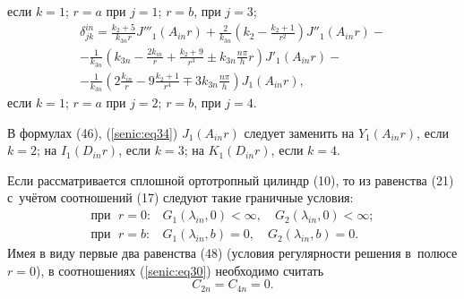 если $k = 1$; $r=a$ при $j = 1$; $r=b$, при $j = 3$;
\begin{multline}
\delta _{jk}^{in} = \frac{k_2 + 5}{k_{3n} r}{J}'''_1 \left( {A_{in} r} 
\right) + \frac{2}{k_{3n} }\left( {k_2 - \frac{k_2 + 1}{r^2}} \right){J}''_1 
\left( {A_{in} r} \right) -\\- \frac{1}{k_{3n} }\left( {k_{3n} - \frac{2k_{in} 
}{r} + \frac{k_2 + 9}{r^3}\pm k_{3n} \frac{n\pi }{h}r} \right){J}'_1 \left( 
{A_{in} r} \right) - \\
\label{senic:eq34}
 - \frac{1}{k_{3n} }\left( {2\frac{k_{in} }{r} - 9\frac{k_2 + 1}{r^4} \mp 
3k_{3n} \frac{n\pi }{h}} \right)J_1 \left( {A_{in} r} \right),
\end{multline}
если $k = 1$; $r=a$ при $j = 2$; $r=b$, при $j = 4$.

В формулах (46), (\ref{senic:eq34}) $J_1 \left( {A_{in} r} \right)$  
следует заменить  
на $Y_1 \left( {A_{in} r} \right)$, если $k = 2$; 
на $I_1 \left( {D_{in} r} \right)$, если $k = 3$;
на $K_1 \left( {D_{in} r} \right)$, если $k = 4$.

Если рассматривается сплошной ортотропный цилиндр (10), то из равенства (21) 
с~учётом соотношений (17) следуют такие граничные условия:
\begin{equation}
 \begin{array}{ll}
\text{при  }\; r = 0: & G_1 \left( {\lambda _{in} ,0} \right) < \infty,\quad G_2\left( {\lambda _{in} ,0} \right) < \infty;\\
\text{при  }\; r = b: & G_1 \left( {\lambda _{in} ,b} \right) = 0,\quad G_2 \left( {\lambda _{in} ,b} \right) = 0.
 \end{array}
\end{equation}
Имея в виду первые два равенства (48) (условия регулярности решения в~полюсе 
$r = 0$), в соотношениях (\ref{senic:eq30}) необходимо считать
\begin{equation}
\label{senic:eq35}
C_{2n} = C_{4n} = 0.
\end{equation}

